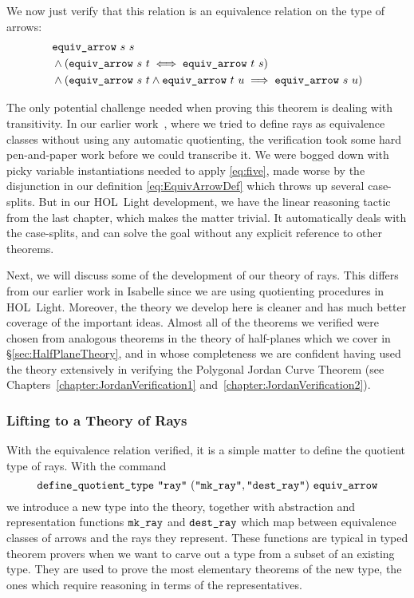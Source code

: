 We now just verify that this relation is an equivalence relation on the type of arrows:
\begin{equation}
  \begin{split}
    &\code{equiv\_arrow}\ s\ s\\
    &\wedge (\code{equiv\_arrow}\ s\ t \iff \code{equiv\_arrow}\ t\ s)\\
    &\wedge (\code{equiv\_arrow}\ s\ t \wedge \code{equiv\_arrow}\ t\ u \implies\code{equiv\_arrow}\ s\ u)
  \end{split}
\end{equation}

\label{sec:RayTransitivity}The only potential challenge needed when proving this theorem is dealing with transitivity. In our earlier work~\cite{ScottMScThesis}, where we tried to define rays as equivalence classes without using any automatic quotienting, the verification took some hard pen-and-paper work before we could transcribe it. We were bogged down with picky variable instantiations needed to apply \ref{eq:five}, made worse by the disjunction in our definition \eqref{eq:EquivArrowDef} which throws up several case-splits. But in our HOL~Light development, we have the linear reasoning tactic from the last chapter, which makes the matter trivial. It automatically deals with the case-splits, and can solve the goal without any explicit reference to other theorems.

Next, we will discuss some of the development of our theory of rays. This differs from our earlier work in Isabelle since we are using quotienting procedures in HOL~Light. Moreover, the theory we develop here is cleaner and has much better coverage of the important ideas. Almost all of the theorems we verified were chosen from analogous theorems in the theory of half-planes which we cover in \S\ref{sec:HalfPlaneTheory}, and in whose completeness we are confident having used the theory extensively in verifying the Polygonal Jordan Curve Theorem (see Chapters~\ref{chapter:JordanVerification1} and~\ref{chapter:JordanVerification2}).

\subsubsection{Lifting to a Theory of Rays}
With the equivalence relation verified, it is a simple matter to define the quotient type of rays. With the command
\begin{displaymath}
  \code{define\_quotient\_type}\ \code{"ray"}\ (\code{"mk\_ray"},\code{"dest\_ray"})\ \code{equiv\_arrow}
\end{displaymath}
we introduce a new type  into the theory, together with abstraction and representation functions $\texttt{mk\_ray}$ and $\texttt{dest\_ray}$ which map between equivalence classes of arrows and the rays they represent. These functions are typical in typed theorem provers when we want to carve out a type from a subset of an existing type. They are used to prove the most elementary theorems of the new type, the ones which require reasoning in terms of the representatives.


